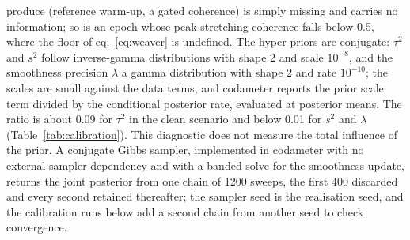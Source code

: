 \documentclass[
  referee]{gji}
\begin{document}
produce (reference warm-up, a gated coherence) is simply missing and
carries no information; so is an epoch whose peak stretching coherence
falls below 0.5, where the floor of eq.~\ref{eq:weaver} is undefined.
The hyper-priors are conjugate: \(\tau^2\) and \(s^2\) follow
inverse-gamma distributions with shape 2 and scale \(10^{-8}\), and the
smoothness precision \(\lambda\) a gamma distribution with shape 2 and
rate \(10^{-10}\); the scales are small against the data terms, and
codameter reports the prior scale term divided by the conditional
posterior rate, evaluated at posterior means. The ratio is about 0.09
for \(\tau^2\) in the clean scenario and below 0.01 for \(s^2\) and
\(\lambda\) (Table~\ref{tab:calibration}). This diagnostic does not
measure the total influence of the prior. A conjugate Gibbs sampler,
implemented in codameter with no external sampler dependency and with a
banded solve for the smoothness update, returns the joint posterior from
one chain of 1200 sweeps, the first 400 discarded and every second
retained thereafter; the sampler seed is the realisation seed, and the
calibration runs below add a second chain from another seed to check
convergence.
\end{document}
